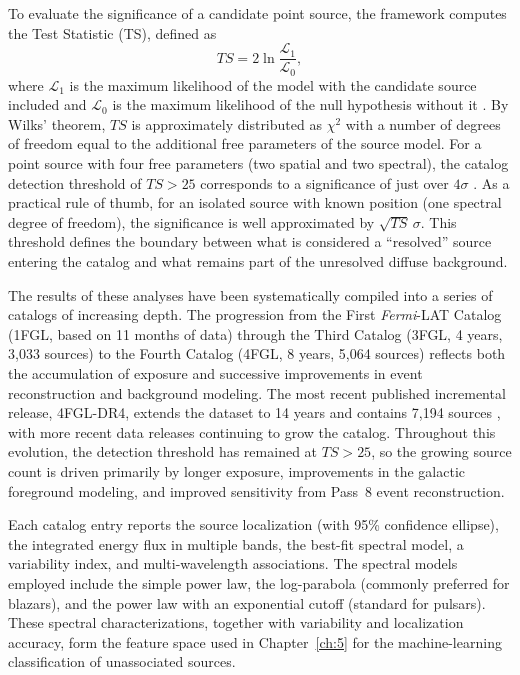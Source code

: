 To evaluate the significance of a candidate point source, the framework computes the Test Statistic (TS), defined as \[ TS = 2\ln\frac{\mathcal{L}_1}{\mathcal{L}_0}, \] where $\mathcal{L}_1$ is the maximum likelihood of the model with the candidate source included and $\mathcal{L}_0$ is the maximum likelihood of the null hypothesis without it \cite{Mattox:1996zz}.
By Wilks' theorem, $TS$ is approximately distributed as $\chi^2$ with a number of degrees of freedom equal to the additional free parameters of the source model.
For a point source with four free parameters (two spatial and two spectral), the catalog detection threshold of $TS > 25$ corresponds to a significance of just over $4\sigma$ \cite{Fermi-LAT:2015bhf,Fermi-LAT:2019yla}.
As a practical rule of thumb, for an isolated source with known position (one spectral degree of freedom), the significance is well approximated by $\sqrt{TS}\,\sigma$.
This threshold defines the boundary between what is considered a ``resolved'' source entering the catalog and what remains part of the unresolved diffuse background.

The results of these analyses have been systematically compiled into a series of catalogs of increasing depth.
The progression from the First \textit{Fermi}-LAT Catalog (1FGL, based on 11 months of data) through the Third Catalog (3FGL, 4 years, 3,033 sources) to the Fourth Catalog (4FGL, 8 years, 5,064 sources) \cite{Fermi-LAT:2015bhf,Fermi-LAT:2019yla} reflects both the accumulation of exposure and successive improvements in event reconstruction and background modeling.
The most recent published incremental release, 4FGL-DR4, extends the dataset to 14 years and contains 7,194 sources \cite{2023arXiv230712546B}, with more recent data releases continuing to grow the catalog.
Throughout this evolution, the detection threshold has remained at $TS > 25$, so the growing source count is driven primarily by longer exposure, improvements in the galactic foreground modeling, and improved sensitivity from Pass~8 event reconstruction.

Each catalog entry reports the source localization (with 95\% confidence ellipse), the integrated energy flux in multiple bands, the best-fit spectral model, a variability index, and multi-wavelength associations.
The spectral models employed include the simple power law, the log-parabola (commonly preferred for blazars), and the power law with an exponential cutoff (standard for pulsars).
These spectral characterizations, together with variability and localization accuracy, form the feature space used in Chapter~\ref{ch:5} for the machine-learning classification of unassociated sources.

